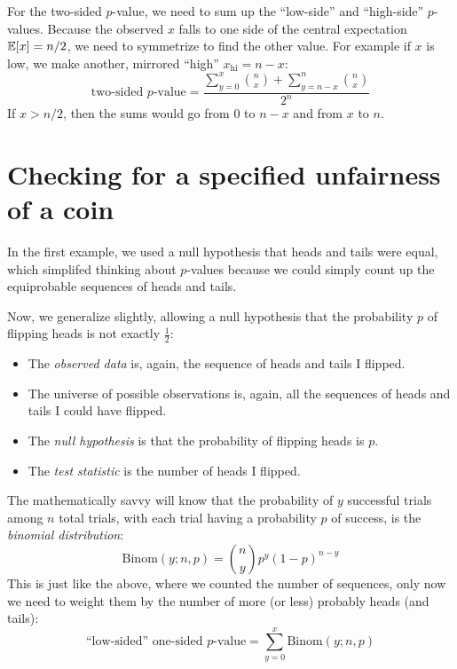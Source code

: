 For the two-sided $p$-value, we need to sum up the ``low-side'' and ``high-side'' $p$-values. Because the observed $x$ falls to one side of the central expectation $\mathbb{E}\!\left[{x}\right] = n/2$, we need to symmetrize to find the other value. For example if $x$ is low, we make another, mirrored ``high'' $x_\mathrm{hi} = n-x$:
\begin{equation}
    \text{two-sided $p$-value} = \frac{\sum_{y=0}^x \binom{n}{x} + \sum_{y=n-x}^n \binom{n}{x}}{2^n}
\end{equation}
If $x > n/2$, then the sums would go from $0$ to $n-x$ and from $x$ to $n$.

\section{Checking for a specified unfairness of a coin}

In the first example, we used a null hypothesis that heads and tails were equal, which simplifed thinking about $p$-values because we could simply count up the equiprobable sequences of heads and tails.

Now, we generalize slightly, allowing a null hypothesis that the probability $p$ of flipping heads is not exactly $\tfrac{1}{2}$:
\begin{itemize}
\item The \emph{observed data} is, again, the sequence of heads and tails I flipped.
\item The universe of possible observations is, again, all the sequences of heads and tails I could have flipped.
\item The \emph{null hypothesis} is that the probability of flipping heads is $p$.
\item The \emph{test statistic} is the number of heads I flipped.
\end{itemize}

The mathematically savvy will know that the probability of $y$ successful trials among $n$ total trials, with each trial having a probability $p$ of success, is the \emph{binomial distribution}:
\begin{equation}
    \mathrm{Binom}(y; n, p) = \binom{n}{y} p^y (1-p)^{n-y}
\end{equation}
This is just like the above, where we counted the number of sequences, only now
we need to weight them by the number of more (or less) probably heads (and
tails):
\begin{equation}
    \text{``low-sided'' one-sided $p$-value} = \sum_{y=0}^x \mathrm{Binom}(y; n, p)
\end{equation}

